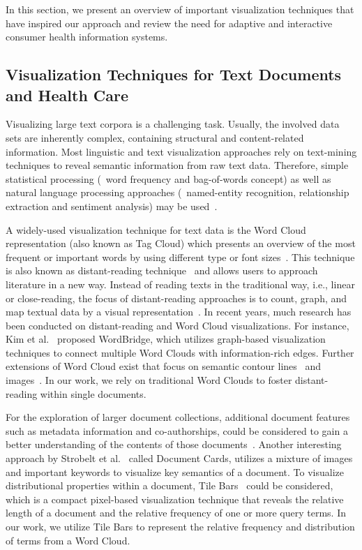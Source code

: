 In this section, we present an overview of important visualization techniques that have inspired our approach and review the need for adaptive and interactive consumer health information systems.

\subsection{Visualization Techniques for Text Documents and Health Care}
Visualizing large text corpora is a challenging task. 
%
Usually, the involved data sets are inherently complex, containing structural and content-related information. 
%
Most linguistic and text visualization approaches rely on text-mining techniques to reveal semantic information from raw text data. 
%
Therefore, simple statistical processing (\eg\ word frequency and bag-of-words concept) as well as natural language processing approaches (\eg\ named-entity recognition, relationship extraction and sentiment analysis) may be used~\cite{10.1002/widm.1071, 7156366}.


A widely-used visualization technique for text data is the Word Cloud representation (also known as Tag Cloud) which presents an overview of the most frequent or important words by using different type or font sizes~\cite{6758829}.
%
This technique is also known as distant-reading technique~\cite{moretti2005graphs} and allows users to approach literature in a new way.
%
Instead of reading texts in the traditional way, i.e., linear or close-reading, the focus of distant-reading approaches is to count, graph, and map textual data by a visual representation~\cite{janicke2015close}.
%
In recent years, much research has been conducted on distant-reading and Word Cloud visualizations. 
%
For instance, Kim et al.~\cite{5718617} proposed WordBridge, which utilizes graph-based visualization techniques to connect multiple Word Clouds with information-rich edges. 
%
Further extensions of Word Cloud exist that focus on semantic contour lines~\cite{2011.01923.x} and images~\cite{doi:10.1177}. 
%
In our work, we rely on traditional Word Clouds to foster distant-reading within single documents.


For the exploration of larger document collections, additional document features such as metadata information and co-authorships, could be considered to gain a better understanding of the contents of those documents~\cite{6392833, 7583708}. 
%
Another interesting approach by Strobelt et al.~\cite{5290723} called Document Cards, utilizes a mixture of images and important keywords to visualize key semantics of a document. 
%
To visualize distributional properties within a document, Tile Bars~\cite{hearst1995tilebars,keim2007literature} could be considered, which is a compact pixel-based visualization technique that reveals the relative length of a document and the relative frequency of one or more query terms. 
%
In our work, we utilize Tile Bars to represent the relative frequency and distribution of terms from a Word Cloud.



